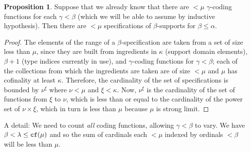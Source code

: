 \documentclass[112pt]{article}
\theoremstyle{definition}
\newtheorem{proposition}[theorem]{Proposition}
\theoremstyle{remark}
\begin{document}
\begin{proposition}\label{prop:count_spec}
Suppose that we already know that there are $<\mu$ $\gamma$-coding functions for each $\gamma<\beta$ (which we will be able to assume by inductive hypothesis).
Then there are $<\mu$ specifications of $\beta$-supports for $\beta\leq \alpha$.
\end{proposition}
\begin{proof}
The elements of the range of a $\beta$-specification are taken from a set of size less than $\mu$, since they are built from ingredients in $\kappa$ (support domain elements), $\beta+1$ (type indices currently in use), and $\gamma$-coding functions for $\gamma<\beta$;  each of the collections from which the ingredients are taken are of size $<\mu$ and $\mu$ has cofinality at least $\kappa$.
Therefore, the cardinality of the set of specifications is bounded by $\nu^\xi$ where $\nu < \mu$ and $\xi < \kappa$.
Now, $\nu^\xi$ is the cardinality of the set of functions from $\xi$ to $\nu$, which is less than or equal to the cardinality of the power set of $\nu \times \xi$, which in turn is less than $\mu$ because $\mu$ is strong limit.
\end{proof}



A detail:  We need to count {\em all\/} coding functions, allowing $\gamma<\beta$ to vary.   We have $\beta < \lambda \leq {\tt cf}(\mu)$ and so the sum of cardinals each $<\mu$ indexed by ordinals $<\beta$ will be less than $\mu$.
\end{document}

